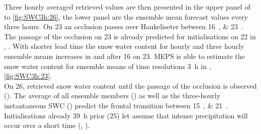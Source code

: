 Three hourly averaged retrieved values are then presented in the upper panel of  to \ref{fig:SWC3h:26}, the lower panel are the ensemble mean forecast values every three hours.
On \SI{23}{\dec} an occlusion passes over Haukeliseter between \SIlist{16;23}{\UTC}. The passage of the occlusion on \SI{23}{\dec} is already predicted for initialisations on \SI{22}{\dec} in , . 
With shorter lead time the snow water content for hourly and three hourly ensemble means increases in  and  after \SI{16}{\UTC} on \SI{23}{\dec}. MEPS is able to estimate the snow water content for ensemble means of time resolutions \SI{3}{\hour} in , \ref{fig:SWC3h:23}.
\\
On \SI{26}{\dec}, retrieved snow water content until the passage of the occlusion is observed (). The average of all ensemble members () as well as the three-hourly instantaneous SWC () predict the frontal transition between \SIlist{15;21}{\UTC}. Initialisations already \SI{39}{\hour} prior (\SI{25}{\dec}) let assume that intense precipitation will occur over a short time (, ). 
\\
